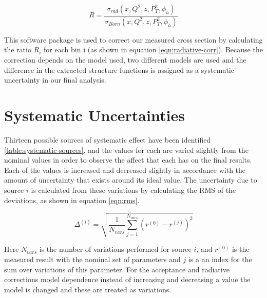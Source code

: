 \begin{equation}
	\label{eqn:radiative-corr}
	R = \frac{\sigma_{rad} (x, Q^2, z, P_T^2, \phi_h)}{\sigma_{Born} (x, Q^2, z, P_T^2, \phi_h)}
\end{equation}

This software package is used to correct our measured cross section by calculating the ratio $R_{i}$ for each bin i (as shown in equation \ref{eqn:radiative-corr}).  Because the correction depends on the model used, two different models are used and the difference in the extracted structure functions is assigned as a systematic uncertainty in our final analysis.
 
\section{Systematic Uncertainties}
Thirteen possible sources of systematic effect have been identified \ref{table:systematic-sources}, and the values for each are varied slightly from the nominal values in order to observe the affect that each has on the final results.  Each of the values is increased and decreased slightly in accordance with the amount of uncertainty that exists around its ideal value.  The uncertainty due to source $i$ is calculated from these variations by calculating the RMS of the deviations, as shown in equation \ref{eqn:rms}.

\begin{equation}
	\label{eqn:rms}
	\Delta^{(i)} = \sqrt{\frac{1}{N_{vars}} \sum_{j = 1}^{N_{vars}} (r^{(0)} - r^{(j)})^2}
\end{equation}

Here $N_{vars}$ is the number of variations performed for source $i$, and $r^{(0)}$ is the measured result with the nominal set of parameters and $j$ is a an index for the sum over variations of this parameter.  For the acceptance and radiative corrections model dependence instead of increasing and decreasing a value the model is changed and these are treated as variations.  \\

